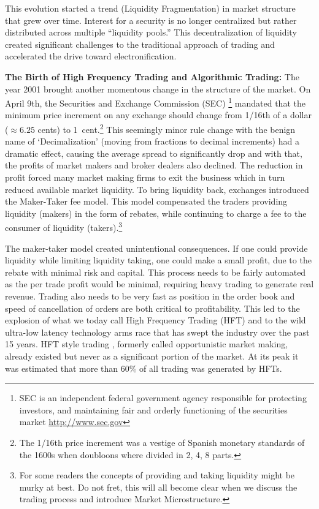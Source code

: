 This evolution started a trend (Liquidity Fragmentation) in market structure that grew over time. Interest for a security is no longer centralized but rather distributed across multiple ``liquidity pools.''  This decentralization of liquidity created significant challenges to the traditional approach of trading and accelerated the drive toward electronification. \twomedskip


\noindent\textbf{The Birth of High Frequency Trading and Algorithmic Trading:} The year 2001 brought another momentous change in the structure of the market. On April 9th, the Securities and Exchange Commission (SEC) \footnote{SEC is an independent federal government agency responsible for protecting investors, and maintaining fair and orderly functioning of the securities market \url{http://www.sec.gov} } mandated that the minimum price increment on any exchange should change from 1/16th of a dollar ($\approx6.25$ cents) to 1~cent.\footnote{The 1/16th price increment was a vestige of Spanish monetary standards of the 1600s when doubloons where divided in 2, 4, 8 parts.} This seemingly minor rule change with the benign name of `Decimalization' (moving from fractions to decimal increments) had a dramatic effect, causing the average spread to significantly drop and with that, the profits of market makers and broker dealers also declined. The reduction in profit forced many market making firms to exit the business which in turn reduced available market liquidity. To bring liquidity back, exchanges introduced the Maker-Taker fee model. This model compensated the traders providing liquidity (makers) in the form of rebates, while continuing to charge a fee to the consumer of liquidity (takers).\footnote{For some readers the concepts of providing and taking liquidity might be murky at best. Do not fret, this will all become clear when we discuss the trading process and introduce Market Microstructure.}


The maker-taker model created unintentional consequences. If one could provide liquidity while limiting liquidity taking, one could make a small profit, due to the rebate with minimal risk and capital. This process needs to be fairly automated as the per trade profit would be minimal, requiring heavy trading to generate real revenue. Trading also needs to be very fast as position in the order book and speed of cancellation of orders are both critical to profitability. This led to the explosion of what we today call High Frequency Trading (HFT) and to the wild ultra-low latency technology arms race that has swept the industry over the past 15 years. HFT style trading , formerly called opportunistic market making, already existed but never as a significant portion of the market. At its peak it was estimated that more than 60\% of all trading was generated by HFTs.


